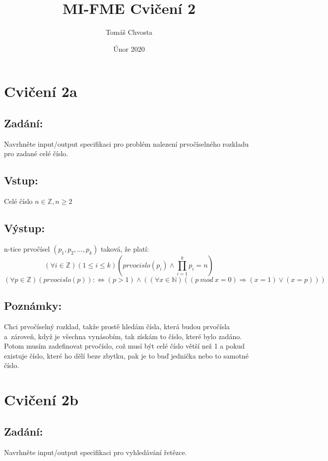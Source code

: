 \documentclass{article}
\title{MI-FME Cvičení 2}
\author{Tomáš Chvosta}
\date{Únor 2020}
\newcommand{\Z}{\mathbb{Z}}
\newcommand{\N}{\mathbb{N}}
\begin{document}
\maketitle

\section{Cvičení 2a}

\subsection{Zadání:}

Navrhněte input/output specifikaci pro problém nalezení prvočíselného rozkladu pro zadané celé číslo.

\subsection{Vstup:}
Celé číslo $ n \in \Z , n \geq 2 $

\subsection{Výstup:}
n-tice prvočísel $ (p_1, p_2, \dots, p_k)$ taková, že platí:
$$(\forall i \in \Z)(1 \leq i \leq k)(prvocislo(p_i) \wedge \prod_{i=1}^k p_i = n) $$
$$(\forall p \in \Z)(prvocislo(p)):\Leftrightarrow  (p > 1) \wedge ((\forall x \in \N)((p\ mod\ x = 0) \Rightarrow (x = 1) \lor (x = p))) $$

\subsection{Poznámky:}
Chci prvočíselný rozklad, takže prostě hledám čísla, která budou prvočísla a~zároveň, když je všechna vynásobím, tak získám to číslo, které bylo zadáno. Potom musím zadefinovat prvočíslo, což musí být celé číslo větší než 1 a pokud existuje číslo, které ho dělí beze zbytku, pak je to buď jednička nebo to samotné číslo.

\section{Cvičení 2b}

\subsection{Zadání:}

Navrhněte input/output specifikaci pro vyhledávání řetězce.
\end{document}
